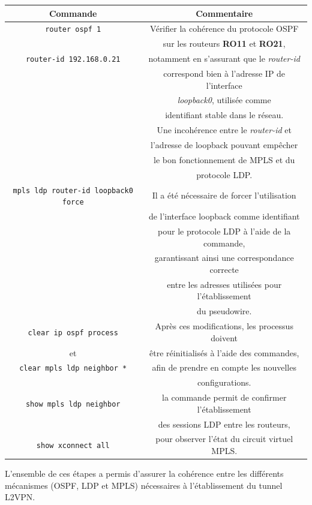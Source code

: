 \documentclass[12pt,a4paper, oneside]{memoir}
\begin{document}
\begin{tabular}{|c|c|}
	\hline
	\textbf{Commande} & \textbf{Commentaire}\\
	\hline
	\texttt{router ospf 1}   & Vérifier la cohérence du protocole OSPF \\
	    & sur les routeurs \textbf{RO11} et \textbf{RO21},\\
	\texttt{router-id 192.168.0.21} &  notamment en s’assurant que le \textit{router-id}\\
	   & correspond bien à l’adresse IP de l’interface \\
	   & \textit{loopback0},  utilisée comme\\
	   & identifiant stable dans le réseau.\\ 
	   & Une incohérence entre le \textit{router-id} et \\ 
	   & l’adresse de loopback pouvant empêcher\\
	   &  le bon fonctionnement de MPLS et du\\
	   & protocole LDP.\\
	\hline
	\texttt{mpls ldp router-id loopback0 force} & Il a été nécessaire de forcer l’utilisation\\
	    & de l’interface loopback comme identifiant \\
	    & pour le protocole LDP à l’aide de la commande, \\
	    & garantissant ainsi une correspondance correcte \\
	    &entre les adresses utilisées pour l’établissement \\
	    & du pseudowire.\\
	\hline
	\texttt{clear ip ospf process} & Après ces modifications, les processus doivent\\ 
	et &  être réinitialisés à l’aide des commandes,\\ 
	\texttt{clear mpls ldp neighbor *}& afin de prendre en compte les nouvelles \\
	 & configurations.\\
	\hline
	\texttt{show mpls ldp neighbor} & la commande permit de confirmer l’établissement\\
	     &  des sessions LDP entre les routeurs,\\
	 \hline
	 \texttt{show xconnect all} &  pour observer l’état du circuit virtuel MPLS.\\
	 \hline
\end{tabular}

\vspace{0.5cm}
L’ensemble de ces étapes a permis d’assurer la cohérence entre les différents mécanismes (OSPF, LDP et MPLS) nécessaires à l’établissement du tunnel L2VPN.
\end{document}
